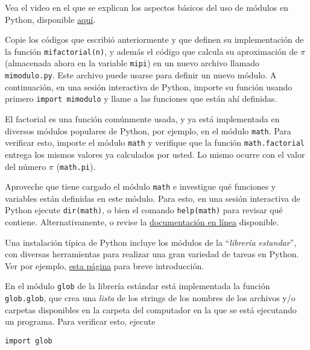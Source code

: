 \documentclass[11pt]{exam}
\begin{document}
\begin{questions}
\item Vea el video en el que se explican los aspectos básicos del uso de módulos en Python, disponible \href{https://udec.instructure.com/courses/51022/pages/modulos?module_item_id=1904638}{aquí}.

\item Copie los códigos que escribió anteriormente y que definen su implementación de la función \texttt{mifactorial(n)}, y además el código que calcula su aproximación de $\pi$ (almacenada ahora en la variable \texttt{mipi}) en un nuevo archivo llamado \texttt{mimodulo.py}. Este archivo puede usarse para definir un nuevo módulo. A continuación, en una sesión interactiva de Python, importe su función usando primero \texttt{import mimodulo} y llame a las funciones que están ahí definidas. 

\item El factorial es una función comúnmente usada, y ya está implementada en diversos módulos populares de Python, por ejemplo, en el módulo \texttt{math}. Para verificar esto, importe el módulo \texttt{math} y verifique que la función \texttt{math.factorial} entrega los mismos valores ya calculados por usted. Lo mismo ocurre con el valor del número $\pi$ (\texttt{math.pi}). 

\item Aproveche que tiene cargado el módulo \texttt{math} e investigue qué funciones y variables están definidas en este módulo. Para esto, en una sesión interactiva de Python ejecute \texttt{dir(math)}, o bien el comando \texttt{help(math)} para revisar qué contiene. Alternativamente, o revise la \href{https://docs.python.org/3/library/math.html}{documentaci\'on en l\'inea} disponible.

\item Una instalación típica de Python incluye los módulos de la ``\textit{librería estandar}'', con diversas herramientas para realizar una gran variedad de tareas en Python. Ver por ejemplo, \href{https://docs.python.org/es/3/library/index.html}{esta página} para breve introducción.


\item En el módulo \texttt{glob} de la librería estándar está implementada la función \texttt{glob.glob}, que crea una \textit{lista} de los strings de los nombres de los archivos y/o carpetas disponibles en la carpeta del computador en la que se está ejecutando un programa. Para verificar esto, ejecute

\begin{verbatim}
import glob


\end{verbatim}
\end{questions}
\end{document}
